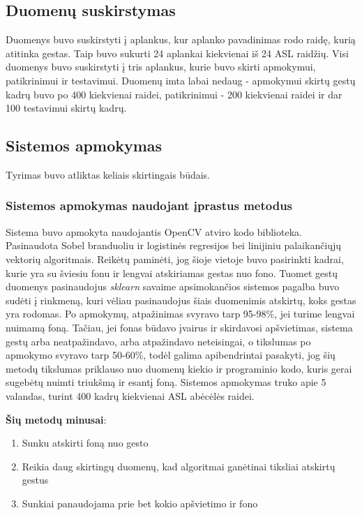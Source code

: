 \documentclass{VUMIFInfKursinis}
\begin{document}
\subsection{Duomenų suskirstymas}

Duomenys buvo suskirstyti į aplankus, kur aplanko pavadinimas rodo raidę, kurią atitinka gestas. Taip buvo sukurti 24 aplankai kiekvienai iš 24 ASL raidžių. Visi duomenys buvo suskirstyti į tris aplankus, kurie buvo skirti apmokymui, patikrinimui ir testavimui. Duomenų imta labai nedaug - apmokymui skirtų gestų kadrų buvo po 400 kiekvienai raidei, patikrinimui - 200 kiekvienai raidei ir dar 100 testavimui skirtų kadrų.

\subsection{Sistemos apmokymas}
Tyrimas buvo atliktas keliais skirtingais būdais.

\subsubsection{Sistemos apmokymas naudojant įprastus metodus}
Sistema buvo apmokyta naudojantis OpenCV atviro kodo biblioteka. Pasinaudota Sobel branduoliu ir logistinės regresijos bei linijiniu palaikančiųjų vektorių algoritmais. Reikėtų paminėti, jog šioje vietoje buvo pasirinkti kadrai, kurie yra su šviesiu fonu ir lengvai atskiriamas gestas nuo fono. Tuomet gestų duomenys pasinaudojus \textit{sklearn} savaime apsimokančios sistemos pagalba buvo sudėti į rinkmeną, kuri vėliau pasinaudojus šiais duomenimis atskirtų, koks gestas yra rodomas. Po apmokymų, atpažinimas svyravo tarp 95-98\%, jei turime lengvai nuimamą foną. Tačiau, jei fonas būdavo įvairus ir skirdavosi apšvietimas, sistema gestų arba neatpažindavo, arba atpažindavo neteisingai, o tikslumas po apmokymo svyravo tarp 50-60\%, todėl galima apibendrintai pasakyti, jog šių metodų tikslumas priklauso nuo duomenų kiekio ir programinio kodo, kuris gerai sugebėtų nuimti triukšmą ir esantį foną. Sistemos apmokymas truko apie 5 valandas, turint 400 kadrų kiekvienai ASL abėcėlės raidei.

\textbf{Šių metodų minusai}:
\begin{enumerate}
	\item Sunku atskirti foną nuo gesto
	\item Reikia daug skirtingų duomenų, kad algoritmai ganėtinai tiksliai atskirtų gestus
	\item Sunkiai panaudojama prie bet kokio apšvietimo ir fono
\end{enumerate}
\end{document}

